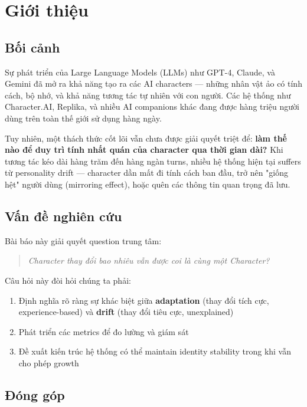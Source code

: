 \documentclass[10pt,leqno]{amsart}
\begin{document}
\section{Giới thiệu}

\subsection{Bối cảnh}

Sự phát triển của Large Language Models (LLMs) như GPT-4, Claude, và Gemini đã mở ra khả năng tạo ra các AI characters --- những nhân vật ảo có tính cách, bộ nhớ, và khả năng tương tác tự nhiên với con người. Các hệ thống như Character.AI, Replika, và nhiều AI companions khác đang được hàng triệu người dùng trên toàn thế giới sử dụng hàng ngày.

Tuy nhiên, một thách thức cốt lõi vẫn chưa được giải quyết triệt để: \textbf{làm thế nào để duy trì tính nhất quán của character qua thời gian dài?} Khi tương tác kéo dài hàng trăm đến hàng ngàn turns, nhiều hệ thống hiện tại suffers từ personality drift --- character dần mất đi tính cách ban đầu, trở nên "giống hệt" người dùng (mirroring effect), hoặc quên các thông tin quan trọng đã lưu.

\subsection{Vấn đề nghiên cứu}

Bài báo này giải quyết question trung tâm:

\begin{quote}
\textit{Character thay đổi bao nhiêu vẫn được coi là cùng một Character?}
\end{quote}

Câu hỏi này đòi hỏi chúng ta phải:
\begin{enumerate}
    \item Định nghĩa rõ ràng sự khác biệt giữa \textbf{adaptation} (thay đổi tích cực, experience-based) và \textbf{drift} (thay đổi tiêu cực, unexplained)
    \item Phát triển các metrics để đo lường và giám sát
    \item Đề xuất kiến trúc hệ thống có thể maintain identity stability trong khi vẫn cho phép growth
\end{enumerate}

\subsection{Đóng góp}
\end{document}

